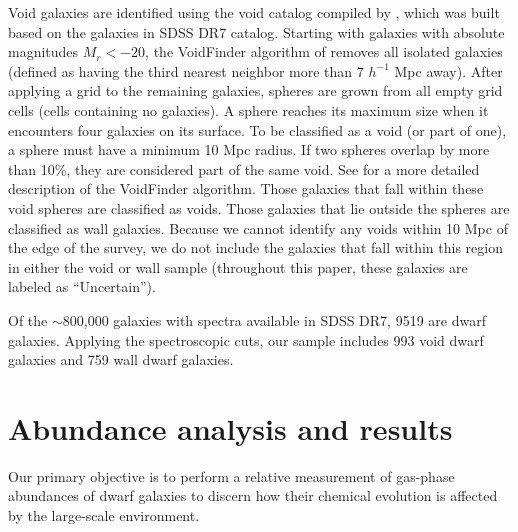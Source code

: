 Void galaxies are identified using the void catalog compiled by \cite{Pan12}, 
which was built based on the galaxies in SDSS DR7 catalog.  Starting with 
galaxies with absolute magnitudes $M_r < -20$, the VoidFinder algorithm of 
\cite{Hoyle02} \citep[based on the algorithm described by][]{ElAd97} removes all 
isolated galaxies (defined as having the third nearest neighbor more than 7 
$h^{-1}$ Mpc away).  After applying a grid to the remaining galaxies, spheres 
are grown from all empty grid cells (cells containing no galaxies).  A sphere 
reaches its maximum size when it encounters four galaxies on its surface.  To be 
classified as a void (or part of one), a sphere must have a minimum 10 Mpc 
radius.  If two spheres overlap by more than 10\%, they are considered part of 
the same void.  See \cite{Hoyle02} for a more detailed description of the 
VoidFinder algorithm.  Those galaxies that fall within these void spheres are 
classified as voids.  Those galaxies that lie outside the spheres are classified 
as wall galaxies.  Because we cannot identify any voids within 10 Mpc of the 
edge of the survey, we do not include the galaxies that fall within this region 
in either the void or wall sample (throughout this paper, these galaxies are 
labeled as ``Uncertain'').

Of the $\sim$800,000 galaxies with spectra available in SDSS DR7, 9519 are 
dwarf galaxies.  Applying the spectroscopic cuts, our sample includes 993 void 
dwarf galaxies and 759 wall dwarf galaxies.


%
%
\section{Abundance analysis and results}

Our primary objective is to perform a relative measurement of gas-phase 
abundances of dwarf galaxies to discern how their chemical evolution is affected 
by the large-scale environment.


